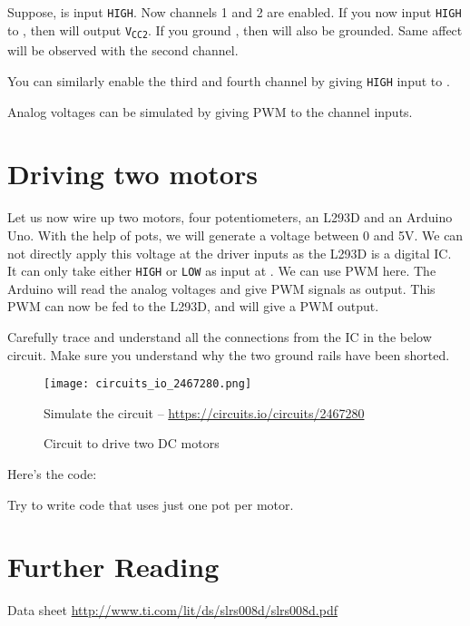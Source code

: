 \documentclass{article}
\begin{document}
	Suppose,  is input \texttt{HIGH}. Now channels 1 and 2 are enabled. If you now input \texttt{HIGH} to , then  will output \texttt{V\textsubscript{CC2}}. If you ground , then  will also be grounded. Same affect will be observed with the second channel.

	You can similarly enable the third and fourth channel by giving \texttt{HIGH} input to .\@

	Analog voltages can be simulated by giving PWM to the channel inputs.

\newpage
	
\section{Driving two motors}

	Let us now wire up two motors, four potentiometers, an L293D and an Arduino Uno. With the help of pots, we will generate a voltage between 0 and 5V. We can not directly apply this voltage at the driver inputs as the L293D is a digital IC. It can only take either \texttt{HIGH} or \texttt{LOW} as input at . We can use PWM here. The Arduino will read the analog voltages and give PWM signals as output. This PWM can now be fed to the L293D, and will give a PWM output.\@

	Carefully trace and understand all the connections from the IC in the below circuit. Make sure you understand why the two ground rails have been shorted.


	\begin{figure}[!h]
		\centering
		\texttt{[image: circuits\_io\_2467280.png]}

		Simulate the circuit -- \url{https://circuits.io/circuits/2467280}
		\caption{Circuit to drive two DC motors}
	\end{figure}

	Here's the code:
	
	

	Try to write code that uses just one pot per motor.

\section{Further Reading}

	Data sheet \url{http://www.ti.com/lit/ds/slrs008d/slrs008d.pdf}
\end{document}
